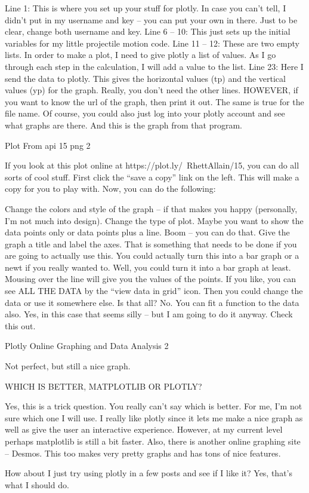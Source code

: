 Line 1: This is where you set up your stuff for plotly. In case you can’t tell, I didn’t put in my username and key – you can put your own in there. Just to be clear, change both username and key.
Line 6 – 10: This just sets up the initial variables for my little projectile motion code.
Line 11 – 12: These are two empty lists. In order to make a plot, I need to give plotly a list of values. As I go through each step in the calculation, I will add a value to the list.
Line 23: Here I send the data to plotly. This gives the horizontal values (tp) and the vertical values (yp) for the graph.
Really, you don’t need the other lines. HOWEVER, if you want to know the url of the graph, then print it out. The same is true for the file name. Of course, you could also just log into your plotly account and see what graphs are there.
And this is the graph from that program.

Plot From api  15  png 2


If you look at this plot online at https://plot.ly/~RhettAllain/15, you can do all sorts of cool stuff. First click the “save a copy” link on the left. This will make a copy for you to play with. Now, you can do the following:



Change the colors and style of the graph – if that makes you happy (personally, I’m not much into design).
Change the type of plot. Maybe you want to show the data points only or data points plus a line. Boom – you can do that.
Give the graph a title and label the axes. That is something that needs to be done if you are going to actually use this.
You could actually turn this into a bar graph or a newt if you really wanted to. Well, you could turn it into a bar graph at least.
Mousing over the line will give you the values of the points. If you like, you can see ALL THE DATA by the “view data in grid” icon. Then you could change the data or use it somewhere else.
Is that all? No. You can fit a function to the data also. Yes, in this case that seems silly – but I am going to do it anyway. Check this out.

Plotly   Online Graphing and Data Analysis 2

Not perfect, but still a nice graph.

WHICH IS BETTER, MATPLOTLIB OR PLOTLY?

Yes, this is a trick question. You really can’t say which is better. For me, I’m not sure which one I will use. I really like plotly since it lets me make a nice graph as well as give the user an interactive experience. However, at my current level perhaps matplotlib is still a bit faster. Also, there is another online graphing site – Desmos. This too makes very pretty graphs and has tons of nice features.

How about I just try using plotly in a few posts and see if I like it? Yes, that’s what I should do.


